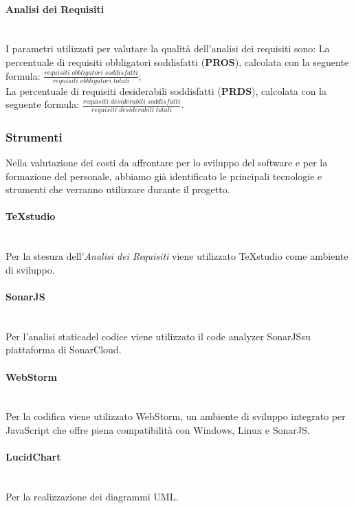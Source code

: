 \paragraph*{Analisi dei Requisiti}\mbox{}\\ [1mm]
I parametri utilizzati per valutare la qualità dell'analisi dei requisiti sono:
La percentuale di requisiti obbligatori soddisfatti (\textbf{PROS}), calcolata con la seguente formula: $\frac{requisiti \; obbligatori \; soddisfatti}{requisiti \; obbligatori \; totali}$; \\
La percentuale di requisiti desiderabili soddisfatti (\textbf{PRDS}), calcolata con la seguente formula: $\frac{requisiti \; desiderabili \; soddisfatti}{requisiti \; desiderabili \; totali}$.
\subsubsection{Strumenti}
Nella valutazione dei costi da affrontare per lo sviluppo del software e per la formazione del personale, abbiamo già identificato le principali tecnologie e strumenti che verranno utilizzare durante il progetto\glo.
\paragraph{TeXstudio}\mbox{}\\ [1mm]
Per la stesura dell'\textit{Analisi dei Requisiti} viene utilizzato TeXstudio come ambiente di sviluppo.
\paragraph{SonarJS}\mbox{}\\ [1mm]
Per l'analisi statica\glosp del codice viene utilizzato il code analyzer SonarJS\glosp su piattaforma di SonarCloud.
\paragraph{WebStorm}\mbox{}\\ [1mm]
Per la codifica viene utilizzato WebStorm, un ambiente di sviluppo integrato per JavaScript che offre piena compatibilità con Windows, Linux e SonarJS\glo.
\paragraph{LucidChart}\mbox{}\\ [1mm]
Per la realizzazione dei diagrammi UML\glo.	